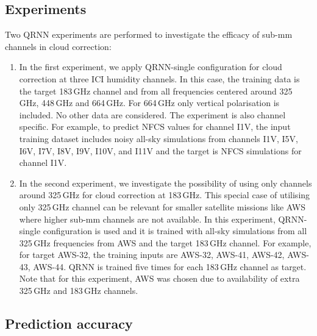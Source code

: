 \documentclass[amt, manuscript]{copernicus}
\begin{document}
\subsection{Experiments}
%
Two QRNN experiments are performed to investigate the efficacy of sub-mm channels in cloud correction: 
\begin{enumerate}
	\item In the first experiment, we apply QRNN-single configuration for cloud correction at three ICI humidity channels. In this case, the training data is the target 183\,GHz channel and from all frequencies  centered around 325\,GHz, 448\,GHz and 664\,GHz. For 664\,GHz only vertical polarisation is included. No other data are considered. The experiment is also channel specific. For example, to predict NFCS values for channel I1V, the input training dataset includes noisy all-sky simulations from channels I1V, I5V, I6V, I7V, I8V, I9V, I10V, and I11V and the target is NFCS simulations for channel I1V.
	
	\item In the second experiment, we investigate the possibility of using only channels around 325\,GHz for cloud correction at 183\,GHz. This special case of utilising only 325\,GHz channel can be relevant for smaller satellite missions like AWS where higher sub-mm channels are not available. In this experiment, QRNN-single configuration is used and it is trained with all-sky simulations from all 325\,GHz frequencies from AWS and the target 183\,GHz channel. For example, for target AWS-32, the training inputs are AWS-32, AWS-41, AWS-42, AWS-43, AWS-44. QRNN is trained five times for each 183\,GHz channel as target. Note that for this experiment, AWS was chosen due to availability of extra 325\,GHz and 183\,GHz channels. 	
\end{enumerate}	

\subsection{Prediction accuracy}
\end{document}
